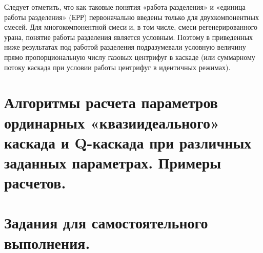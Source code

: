 Следует отметить, что как таковые понятия «работа разделения» и «единица работы разделения» (ЕРР) первоначально введены только для двухкомпонентных смесей. Для многокомпонентной смеси и, в том числе, смеси регенерированного урана, понятие работы разделения является условным. Поэтому в приведенных ниже результатах под работой разделения подразумевали условную величину прямо пропорциональную числу газовых центрифуг в каскаде (или суммарному потоку каскада при условии работы центрифуг в идентичных режимах).

\section{Алгоритмы расчета параметров ординарных «квазиидеального» каскада и Q-каскада при различных заданных параметрах. Примеры расчетов.}


\section{Задания для самостоятельного выполнения.}



\clearpage